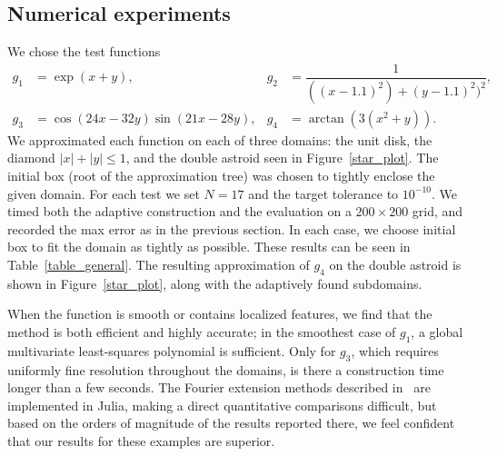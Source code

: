\subsection{Numerical experiments}

We chose the test functions 
\begin{equation}
  \label{eq:testfun-gen}
  \begin{aligned}
    g_1& =\exp(x+y), & g_2&=\dfrac{1}{((x-1.1)^2)+(y-1.1)^2)^2}, \\
    g_3 &=\cos(24x-32y)\sin(21x-28y), & g_4&=\arctan(3(x^2+y)).
  \end{aligned}
\end{equation}
We approximated each function on each of three domains: the unit disk, the diamond $|x|+|y|\le 1$, and the double astroid seen in Figure~\ref{star_plot}. The initial box (root of the approximation tree) was chosen to tightly enclose the given domain. For each test we set $N=17$ and the target tolerance to $10^{-10}$. We timed both the adaptive construction and the evaluation on a $200\times 200$ grid, and recorded the max error as in the previous section. In each case, we choose initial box to fit the domain as tightly as possible. These results can be seen in Table~\ref{table_general}. The resulting approximation of $g_4$ on the double astroid is shown in Figure~\ref{star_plot}, along with the adaptively found subdomains. 

When the function is smooth or contains localized features, we find that the method is both efficient and highly accurate; in the smoothest case of $g_1$, a global multivariate least-squares polynomial is sufficient. Only for $g_3$, which requires uniformly fine resolution throughout the domains, is there a construction time longer than a few seconds. The Fourier extension methods described in~\cite{matthysen2017function} are implemented in Julia, making a direct quantitative comparisons difficult, but based on the orders of magnitude of the results reported there, we feel confident that our results for these examples are superior. 




